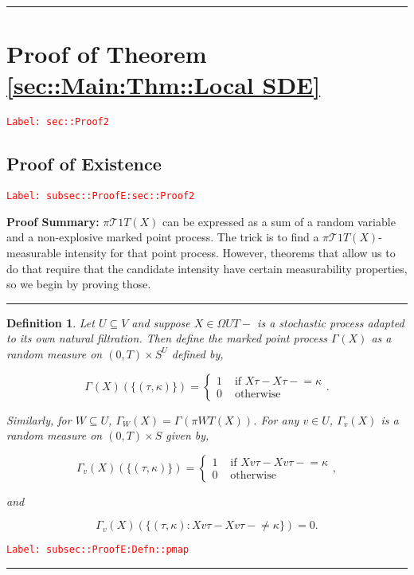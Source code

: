 \documentclass[12pt]{article}
\newcommand{\mc}{\mathcal}
\newcommand{\te}{\text}
\newcommand{\tr}{\textcolor{red}}
\newcommand{\labe}[1]{\tr{\texttt{Label: #1}}}
\newcommand{\pfsum}{\textbf{Proof Summary: }}
\newcommand{\lin}{\rule{\linewidth}{0.4 pt}}
\renewcommand{\v}{v}							%
\renewcommand{\U}{U}							%
\newcommand{\UU}{W}								%
\renewcommand{\S}{S}							%
\newcommand{\T}{T}								%
\newcommand{\proj}{\pi}							%
\newcommand{\X}{X}								%
\newcommand{\tree}{\mc{T}}						%
\newcommand{\rt}{\tau}							%
\newcommand{\pmap}[1]{\Gamma_{#1}}				%
\renewcommand{\mark}{\kappa}					%
\newtheorem{defn}[thms]{Definition}
\begin{document}
\lin

\section{Proof of Theorem \ref{sec::Main:Thm::Local SDE}}
\label{sec::Proof2}\labe{sec::Proof2}

\subsection{Proof of Existence}
\label{subsec::ProofE:sec::Proof2}\labe{subsec::ProofE:sec::Proof2}

\pfsum \(\proj{\tree{1}}{\T}(\X{}{})\) can be expressed as a sum of a random variable and a non-explosive marked point process. The trick is to find a \(\proj{\tree{1}}{\T}(\X{}{})\)-measurable intensity for that point process. However, theorems that allow us to do that require that the candidate intensity have certain measurability properties, so we begin by proving those.

\lin

\begin{defn}
Let \(\U\subseteq  V\) and suppose \(\X{}{} \in \Omega{\U}{\T-}\) is a stochastic process adapted to its own natural filtration. Then define the marked point process \(\pmap{}(\X{}{})\) as a random measure on \((0,\T) \times \S^\U\) defined by,

\[\pmap{}(\X{}{})(\{(\rt{},\mark{})\}) = \begin{cases}
1 &\te{ if } \X{}{\rt{}} - \X{}{\rt{}-} = \mark{}\\
0 &\te{ otherwise}
\end{cases}.\]

Similarly, for \(\UU \subseteq \U\), \(\pmap{\UU}(\X{}{}) = \pmap{}\left(\proj{\UU}{\T}(\X{}{})\right)\). For any \(\v\in \U\), \(\pmap{\v}(\X{}{})\) is a random measure on \((0,\T) \times \S\) given by,

\[\pmap{\v}(\X{}{})(\{(\rt{},\mark{})\}) = \begin{cases}
1 &\te{ if } \X{\v}{\rt{}} - \X{\v}{\rt{}-} = \mark{}\\
0 &\te{ otherwise}
\end{cases},\]

and

\[\pmap{\v}(\X{}{})(\{(\rt{},\mark{}): \X{\v}{\rt{}} - \X{\v}{\rt{}-} \neq \mark{}\}) = 0.\]
\label{subsec::ProofE:Defn::pmap}
\end{defn}
\labe{subsec::ProofE:Defn::pmap}

\lin
\end{document}
